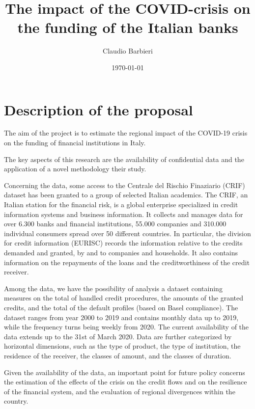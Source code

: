 \documentclass[a4paper,11pt]{article}
\title{The impact of the COVID-crisis on the funding of the Italian banks}
\author[1,2]{Claudio Barbieri}
\affil[1]{Universit\'{e} de C\^{o}te D'Azur, GREDEG}
\affil[2]{Scuola Superiore Sant'Anna}
\date{\today}
\begin{document}
\vspace{-10cm}
\maketitle

\section{Description of the proposal}
\noindent The aim of the project is to estimate the regional impact of the COVID-19 crisis on the funding of financial institutions in Italy. 

The key aspects of this research are the availability of confidential data and the application of a novel methodology their study.

Concerning the data, some access to the Centrale del Rischio Finaziario (CRIF) dataset has been granted to a group of selected Italian academics. The CRIF, an Italian station for the financial risk, is a global enterprise specialized in credit information systems and business information. It collects and manages data for over 6.300 banks and financial institutions, 55.000 companies and 310.000 individual consumers spread over 50 different countries. In particular, the division for credit information (EURISC) records the information relative to the credits demanded and granted, by and to companies and households. It also contains information on the repayments of the loans and the creditworthiness of the credit receiver. 

Among the data, we have the possibility of analysis a dataset containing measures on the total of handled credit procedures, the amounts of the granted credits, and the total of the default profiles (based on Basel compliance). The dataset ranges from year 2000 to 2019 and contains monthly data up to 2019, while the frequency turns being weekly from 2020. The current availability of the data extends up to the 31st of March 2020. Data are further categorized by horizontal dimensions, such as the type of product, the type of institution, the residence of the receiver, the classes of amount, and the classes of duration. 

Given the availability of the data, an important point for future policy concerns the estimation of the effects of the crisis on the credit flows and on the resilience of the financial system, and the evaluation of regional divergences within the country. 
\end{document}
